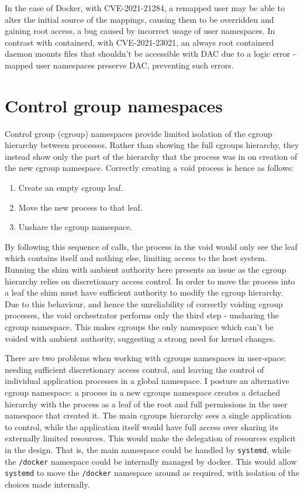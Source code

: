 \documentclass[12pt,a4paper,twoside]{report}
\begin{document}
In the case of Docker, with CVE-2021-21284, a remapped user may be able to alter the initial source of the mappings, causing them to be overridden and gaining root access, a bug caused by incorrect usage of user namespaces. In contrast with containerd, with CVE-2021-23021, an always root containerd daemon mounts files that shouldn't be accessible with DAC due to a logic error - mapped user namespaces preserve DAC, preventing such errors.

\section{Control group namespaces}
\label{sec:voiding-cgroup}

Control group (cgroup) namespaces provide limited isolation of the cgroup hierarchy between processes. Rather than showing the full cgroups hierarchy, they instead show only the part of the hierarchy that the process was in on creation of the new cgroup namespace. Correctly creating a void process is hence as follows:

\begin{enumerate}
    \item Create an empty cgroup leaf.
    \item Move the new process to that leaf.
    \item Unshare the cgroup namespace.
\end{enumerate}

By following this sequence of calls, the process in the void would only see the leaf which contains itself and nothing else, limiting access to the host system. Running the shim with ambient authority here presents an issue as the cgroup hierarchy relies on discretionary access control. In order to move the process into a leaf the shim must have sufficient authority to modify the cgroup hierarchy. Due to this behaviour, and hence the unreliability of correctly voiding cgroup processes, the void orchestrator performs only the third step - unsharing the cgroup namespace. This makes cgroups the only namespace which can't be voided with ambient authority, suggesting a strong need for kernel changes.

There are two problems when working with cgroups namespaces in user-space: needing sufficient discretionary access control, and leaving the control of individual application processes in a global namespace. I posture an alternative cgroup namespace: a process in a new cgroups namespace creates a detached hierarchy with the process as a leaf of the root and full permissions in the user namespace that created it. The main cgroups hierarchy sees a single application to control, while the application itself would have full access over sharing its externally limited resources. This would make the delegation of resources explicit in the design. That is, the main namespace could be handled by \texttt{systemd}, while the \texttt{/docker} namespace could be internally managed by docker. This would allow \texttt{systemd} to move the \texttt{/docker} namespace around as required, with isolation of the choices made internally.
\end{document}
